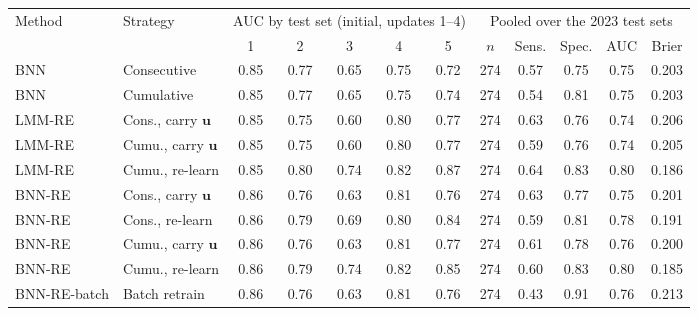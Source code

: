 \begin{tabular}{ll ccccc ccccc}
\hline
Method & Strategy & \multicolumn{5}{c}{AUC by test set (initial, updates 1--4)} & \multicolumn{5}{c}{Pooled over the 2023 test sets} \\
\cline{3-7}\cline{8-12}
 & & 1 & 2 & 3 & 4 & 5 & $n$ & Sens. & Spec. & AUC & Brier \\
\hline
BNN & Consecutive & 0.85 & 0.77 & 0.65 & 0.75 & 0.72 & 274 & 0.57 & 0.75 & 0.75 & 0.203 \\
BNN & Cumulative & 0.85 & 0.77 & 0.65 & 0.75 & 0.74 & 274 & 0.54 & 0.81 & 0.75 & 0.203 \\
LMM-RE & Cons., carry $\bm u$ & 0.85 & 0.75 & 0.60 & 0.80 & 0.77 & 274 & 0.63 & 0.76 & 0.74 & 0.206 \\
LMM-RE & Cumu., carry $\bm u$ & 0.85 & 0.75 & 0.60 & 0.80 & 0.77 & 274 & 0.59 & 0.76 & 0.74 & 0.205 \\
LMM-RE & Cumu., re-learn & 0.85 & 0.80 & 0.74 & 0.82 & 0.87 & 274 & 0.64 & 0.83 & 0.80 & 0.186 \\
BNN-RE & Cons., carry $\bm u$ & 0.86 & 0.76 & 0.63 & 0.81 & 0.76 & 274 & 0.63 & 0.77 & 0.75 & 0.201 \\
BNN-RE & Cons., re-learn & 0.86 & 0.79 & 0.69 & 0.80 & 0.84 & 274 & 0.59 & 0.81 & 0.78 & 0.191 \\
BNN-RE & Cumu., carry $\bm u$ & 0.86 & 0.76 & 0.63 & 0.81 & 0.77 & 274 & 0.61 & 0.78 & 0.76 & 0.200 \\
BNN-RE & Cumu., re-learn & 0.86 & 0.79 & 0.74 & 0.82 & 0.85 & 274 & 0.60 & 0.83 & 0.80 & 0.185 \\
BNN-RE-batch & Batch retrain & 0.86 & 0.76 & 0.63 & 0.81 & 0.76 & 274 & 0.43 & 0.91 & 0.76 & 0.213 \\
\hline
\end{tabular}